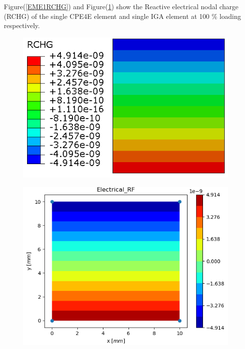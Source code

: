 \documentclass[11pt]{article}
\begin{document}
Figure(\ref{EME1RCHG}) and Figure(\ref{EME1RCHG_IGA}) show the Reactive electrical nodal charge (RCHG) of the single CPE4E element and single IGA element at 100 \% loading respectively. \\
\begin{figure}[H]
	\centering
	\begin{minipage}{.5\textwidth}
		\centering
		\includegraphics[width=1\linewidth]{EME1RCHG.png}
		\label{EME1RCHG}
	\end{minipage}%
	\begin{minipage}{.5\textwidth}
		\centering
		\includegraphics[width=1\linewidth]{EME1RCHG_IGA.png}
		\label{EME1RCHG_IGA}
	\end{minipage}
\end{figure}
\end{document}
